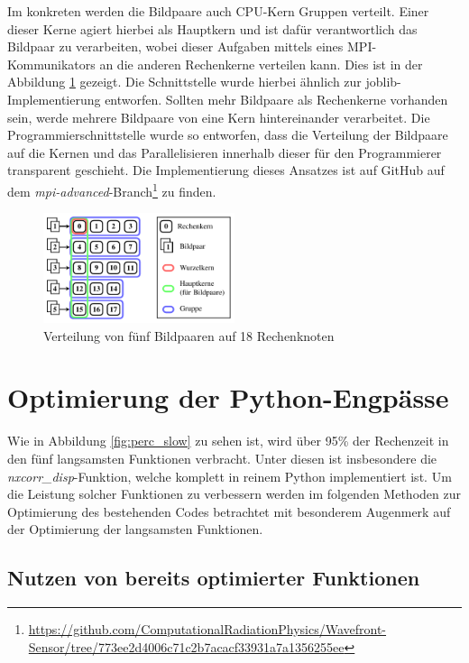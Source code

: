 Im konkreten werden die Bildpaare auch \gls{CPU}-Kern Gruppen verteilt. Einer dieser Kerne agiert hierbei als Hauptkern und ist dafür verantwortlich das Bildpaar zu verarbeiten, wobei dieser Aufgaben mittels eines \gls{MPI}-Kommunikators an die anderen Rechenkerne verteilen kann. Dies ist in der Abbildung \ref{fig:parallel_concept} gezeigt. Die Schnittstelle wurde hierbei ähnlich zur joblib-Implementierung entworfen. Sollten mehr Bildpaare als Rechenkerne vorhanden sein, werde mehrere Bildpaare von eine Kern hintereinander verarbeitet. Die Programmierschnittstelle wurde so entworfen, dass die Verteilung der Bildpaare auf die Kernen und das Parallelisieren innerhalb dieser für den Programmierer transparent geschieht. Die Implementierung dieses Ansatzes ist auf GitHub auf dem \textit{mpi-advanced}-Branch\footnote{\url{https://github.com/ComputationalRadiationPhysics/Wavefront-Sensor/tree/773ee2d4006c71c2b7acacf33931a7a1356255ee}} zu finden.

\begin{center}
	\begin{figure}[htbp]
		\centering
		\includegraphics[width=0.5\textwidth]{pdf/parallel}
		\caption[Verteilung]{Verteilung von fünf Bildpaaren auf 18 Rechenknoten}
		\label{fig:parallel_concept}
	\end{figure}
\end{center}

\section{Optimierung der Python-Engpässe}

Wie in Abbildung \ref{fig:perc_slow} zu sehen ist, wird über 95\% der Rechenzeit in den fünf langsamsten Funktionen verbracht. Unter diesen ist insbesondere die \textit{nxcorr\_disp}-Funktion, welche komplett in reinem Python implementiert ist. Um die Leistung solcher Funktionen zu verbessern werden im folgenden Methoden zur Optimierung des bestehenden Codes betrachtet mit besonderem Augenmerk auf der Optimierung der langsamsten Funktionen. 

\subsection{Nutzen von bereits optimierter Funktionen}

